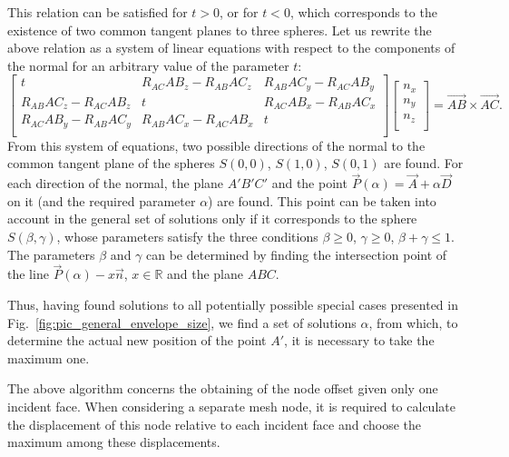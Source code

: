 \documentclass[
11pt,
tightenlines,
twoside,
onecolumn,
nofloats,
nobibnotes,
nofootinbib,
superscriptaddress,
noshowpacs,
centertags]
{revtex4}
\begin{document}
This relation can be satisfied for $t > 0$, or for  $t < 0$, which
corresponds to the existence of two common tangent planes to three
spheres.
Let us rewrite the above relation as a system  of linear equations
with respect to the components of the normal for an arbitrary value
of the parameter $t$:
\begin{equation*}
\left[ { \begin{array}{ccc}
             t & R_{AC} AB_z - R_{AB} AC_z & R_{AB} AC_y - R_{AC} AB_y \\
             R_{AB} AC_z - R_{AC} AB_z & t & R_{AC} AB_x - R_{AB} AC_x \\
             R_{AC} AB_y - R_{AB} AC_y & R_{AB} AC_x - R_{AC} AB_x & t \\
         \end{array} } \right]
\left[ { \begin{array}{c}
            n_x \\
            n_y \\
            n_z \\
         \end{array} } \right]
= \vec{AB} \times \vec{AC}.
\end{equation*}
From this system of equations, two possible directions of the normal
to the common tangent plane of the spheres $S(0,0)$, $S(1,0)$, $S(0,
1)$ are found.
For each direction of the normal, the plane $A'B'C'$ and the point $\vec{P}(\alpha) = \vec{A} + \alpha \vec{D}$ on it (and the required parameter $\alpha$) are found.
This point can be taken into account in the general set of solutions only if it corresponds to the sphere $S(\beta, \gamma)$, whose parameters satisfy the three conditions $\beta \ge 0$, $\gamma \ge 0$, $ \beta + \gamma \le 1$.
The parameters $\beta$ and $\gamma$ can be determined by finding the intersection point of the line $\vec{P}(\alpha) - x \vec{n}$, $x \in \mathbb{R}$ and the plane $ABC$.

Thus, having found solutions to all potentially possible special
cases presented in Fig.~\ref{fig:pic_general_envelope_size}, we find
a set of solutions $\alpha$, from which, to determine the actual new
position of the point $A'$, it is necessary to take the maximum one.

The above algorithm concerns the obtaining of the node offset given only one incident face.
When considering a separate mesh node, it is required to calculate the displacement of this node relative to each incident face and choose the maximum among these displacements.
\end{document}

